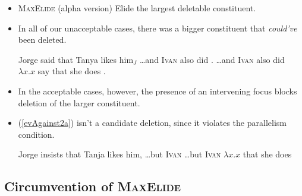 \documentclass[nofonts,nobib]{tufte-handout}
\begin{document}
\begin{itemize}

  \item {}
    
\ex \textsc{MaxElide} (alpha version)\newline
Elide the largest deletable constituent.
\xe
    
  \item In all of our unacceptable cases, there was a bigger constituent that \emph{could've} been deleted.
    
\pex\label{rebinding3}Jorge said that Tanya likes him\(_{J}\)
    \a\label{rebinding3a}\ldots and \textsc{Ivan} also did .
    \a\ljudge{*}\label{rebinding3b}\ldots and \textsc{Ivan} also did \( λ x . x \) say that she does .
    \xe
    
  \item In the acceptable cases, however, the presence of an intervening focus blocks deletion of the larger constituent.
    
  \item (\ref{evAgainst2a}) isn't a candidate deletion, since it violates the parallelism condition.
    
\pex
    \label{evAgainst2}Jorge insists that Tanja likes him,
    \a\label{evAgainst2a}\ljudge{\xmark}\ldots but \textsc{Ivan} 
    \a\label{evAgainst2b}\ljudge{\cmark}\ldots but \textsc{Ivan} \( λ x . x \)  that she does 
    \xe

\end{itemize}

\subsection{Circumvention of \textsc{MaxElide}}
\end{document}
